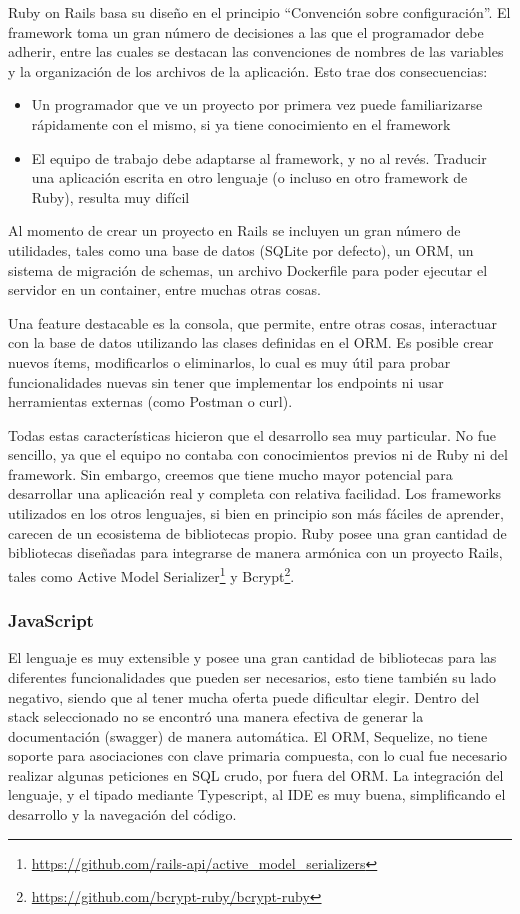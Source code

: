 \documentclass[11pt]{article}
\let\Oldsubsubsection\subsubsection
\renewcommand{\subsubsection}{\FloatBarrier\Oldsubsubsection}
\begin{document}
Ruby on Rails basa su diseño en el principio “Convención sobre configuración”. El framework toma un gran número de decisiones a las que el programador debe adherir, entre las cuales se destacan las convenciones de nombres de las variables y la organización de los archivos de la aplicación. Esto trae dos consecuencias:
\begin{itemize}
    \item Un programador que ve un proyecto por primera vez puede familiarizarse rápidamente con el mismo, si ya tiene conocimiento en el framework
    \item El equipo de trabajo debe adaptarse al framework, y no al revés. Traducir una aplicación escrita en otro lenguaje (o incluso en otro framework de Ruby), resulta muy difícil
\end{itemize}

Al momento de crear un proyecto en Rails se incluyen un gran número de utilidades, tales como una base de datos (SQLite por defecto), un ORM, un sistema de migración de schemas, un archivo Dockerfile para poder ejecutar el servidor en un container, entre muchas otras cosas.

Una feature destacable es la consola, que permite, entre otras cosas, interactuar con la base de datos utilizando las clases definidas en el ORM. Es posible crear nuevos ítems, modificarlos o eliminarlos, lo cual es muy útil para probar funcionalidades nuevas sin tener que implementar los endpoints ni usar herramientas externas (como Postman o curl).

Todas estas características hicieron que el desarrollo sea muy particular. No fue sencillo, ya que el equipo no contaba con conocimientos previos ni de Ruby ni del framework. Sin embargo, creemos que tiene mucho mayor potencial para desarrollar una aplicación real y completa con relativa facilidad. Los frameworks utilizados en los otros lenguajes, si bien en principio son más fáciles de aprender, carecen de un ecosistema de bibliotecas propio. Ruby posee una gran cantidad de bibliotecas diseñadas para integrarse de manera armónica con un proyecto Rails, tales como Active Model Serializer\footnote{\url{https://github.com/rails-api/active_model_serializers}} y Bcrypt\footnote{\url{https://github.com/bcrypt-ruby/bcrypt-ruby}}.


\subsubsection{JavaScript}

El lenguaje es muy extensible y posee una gran cantidad de bibliotecas para las diferentes funcionalidades que pueden ser necesarios, esto tiene también su lado negativo, siendo que al tener mucha oferta puede dificultar elegir.
Dentro del stack seleccionado no se encontró una  manera efectiva de generar la documentación (swagger) de manera automática.
El ORM, Sequelize, no tiene soporte para asociaciones con clave primaria compuesta, con lo cual fue necesario realizar algunas peticiones en SQL crudo, por fuera del ORM.
La integración del lenguaje, y el tipado mediante Typescript, al IDE es muy buena, simplificando el desarrollo y la navegación del código.
\end{document}
